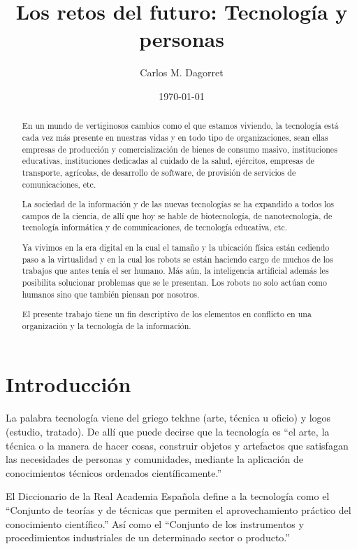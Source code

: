 \documentclass[a4paper, 12pt]{article}
\title{Los retos del futuro: Tecnología y personas}
\author{Carlos M. Dagorret}
\date{\today}
\begin{document}
\maketitle

\begin{abstract}
En un mundo de vertiginosos cambios como el que estamos viviendo, la tecnología está cada vez más presente en nuestras vidas y en todo tipo de organizaciones, sean ellas empresas de producción y comercialización de bienes de consumo masivo, instituciones educativas, instituciones dedicadas al cuidado de la salud, ejércitos, empresas de transporte, agrícolas, de desarrollo de software, de provisión de servicios de comunicaciones, etc.

La sociedad de la información y de las nuevas tecnologías se ha expandido a todos los campos de la ciencia, de allí que hoy se hable de biotecnología, de nanotecnología, de tecnología informática y de comunicaciones, de tecnología educativa, etc.

Ya vivimos en la era digital en la cual el tamaño y la ubicación física están cediendo paso a la virtualidad y en la cual los robots se están haciendo cargo de muchos de los trabajos que antes tenía el ser humano. Más aún, la inteligencia artificial además les posibilita solucionar problemas que se le presentan. Los robots no solo actúan como humanos sino que también piensan por nosotros.

El presente trabajo tiene un fin descriptivo de los elementos en conflicto en una organización y la tecnología de la información.
\end{abstract}

\section{Introducción}
\label{sec:Introduccion}

La palabra tecnología viene del griego tekhne (arte, técnica u oficio) y logos (estudio, tratado). De allí que puede decirse que la tecnología es “el arte, la técnica o la manera de hacer cosas, construir objetos y artefactos que satisfagan las necesidades de personas y comunidades, mediante la aplicación de conocimientos técnicos ordenados científicamente.”

El Diccionario de la Real Academia Española define a la tecnología como el “Conjunto de teorías y de técnicas que permiten el aprovechamiento práctico del conocimiento científico.” Así como el “Conjunto de los instrumentos y procedimientos industriales de un determinado sector o producto.”
\end{document}
